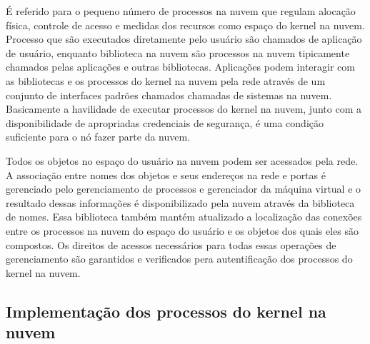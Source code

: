 \documentclass{llncs}
\begin{document}
É referido para o pequeno número de processos na nuvem que regulam alocação física, controle de acesso e medidas dos recursos como espaço do kernel na nuvem. Processo que são executados diretamente pelo usuário são chamados de aplicação de usuário, enquanto biblioteca na nuvem são processos na nuvem tipicamente chamados pelas aplicações e outras bibliotecas. Aplicações podem interagir com as bibliotecas e os processos do kernel na nuvem pela rede através de um conjunto de interfaces padrões chamados chamadas de sistemas na nuvem. Basicamente a havilidade de executar processos do kernel na nuvem, junto com a disponibilidade de apropriadas credenciais de segurança, é uma condição suficiente para o nó fazer parte da nuvem.

Todos os objetos no espaço do usuário na nuvem podem ser acessados  pela rede. A associação entre nomes dos objetos e seus endereços na rede e portas é gerenciado pelo gerenciamento de processos e gerenciador da máquina virtual e o resultado dessas informações é disponibilizado pela nuvem através da biblioteca de nomes. Essa biblioteca também mantém atualizado a localização das conexões entre os processos na nuvem do espaço do usuário e os objetos dos quais eles são compostos. Os direitos de acessos necessários para todas essas operações de gerenciamento são garantidos e verificados pera autentificação dos processos do kernel na nuvem.

\subsection{Implementação dos processos do kernel na nuvem}
\end{document}

